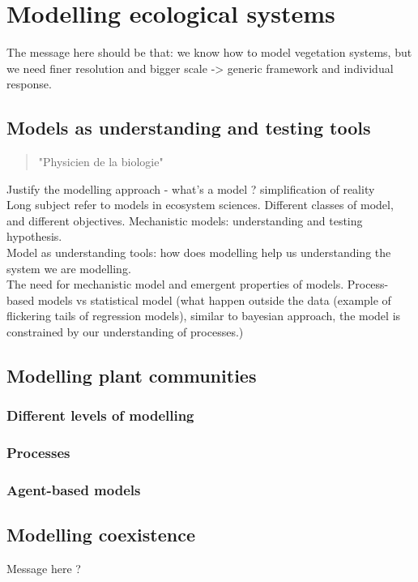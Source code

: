 \chapter{Modelling ecological systems}
The message here should be that: we know how to model vegetation systems, but we need finer resolution and bigger scale -> generic framework and individual response.

\section{Models as understanding and testing tools}

\begin{quote}
"Physicien de la biologie"
\end{quote}
Justify the modelling approach - what's a model ? simplification of reality\\
Long subject refer to models in ecosystem sciences. Different classes of model, and different objectives. Mechanistic models: understanding and testing hypothesis.\\
Model as understanding tools: how does modelling help us understanding the system we are modelling.\\
The need for mechanistic model and emergent properties of models. Process-based models vs statistical model (what happen outside the data (example of flickering tails of regression models), similar to bayesian approach, the model is constrained by our understanding of processes.) \\

\section{Modelling plant communities}

\subsection{Different levels of modelling}

\subsection{Processes}

\subsection{Agent-based models}


\section{Modelling coexistence}
Message here ?

